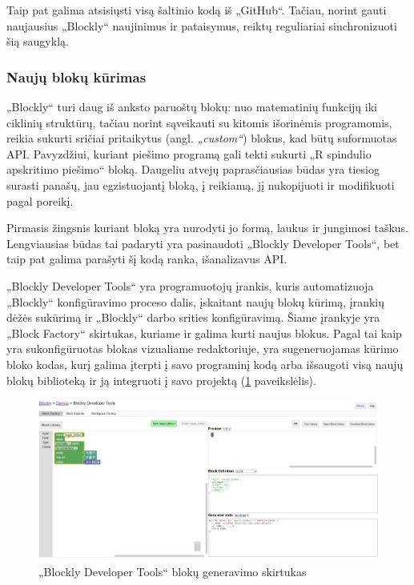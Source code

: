 \documentclass{VUMIFPSkursinis}
\begin{document}
Taip pat galima atsisiųsti visą šaltinio kodą iš „GitHub“. Tačiau, norint gauti naujausius „Blockly“ naujinimus ir pataisymus, reiktų reguliariai sinchronizuoti šią saugyklą.

\subsubsection{Naujų blokų kūrimas}

„Blockly“ turi daug iš anksto paruoštų blokų: nuo matematinių funkcijų iki ciklinių struktūrų, tačiau norint sąveikauti su kitomis išorinėmis programomis, reikia sukurti sričiai pritaikytus (angl. \textit{„custom“}) blokus, kad būtų suformuotas API. Pavyzdžiui, kuriant piešimo programą gali tekti sukurti „R spindulio apskritimo piešimo“ bloką. Daugeliu atvejų paprasčiausias būdas yra tiesiog surasti panašų, jau egzistuojantį bloką, į reikiamą, jį nukopijuoti ir modifikuoti pagal poreikį.


Pirmasis žingsnis kuriant bloką yra nurodyti jo formą, laukus ir jungimosi taškus. Lengviausias būdas tai padaryti yra pasinaudoti „Blockly Developer Tools“, bet taip pat galima parašyti šį kodą ranka, išanalizavus API.

„Blockly Developer Tools“ yra programuotojų įrankis, kuris automatizuoja „Blockly“ konfigūravimo proceso dalis, įskaitant naujų blokų kūrimą, įrankių dėžės sukūrimą ir „Blockly“ darbo srities konfigūravimą. Šiame įrankyje yra „Block Factory“ skirtukas, kuriame ir galima kurti naujus blokus. Pagal tai kaip yra sukonfigūruotas blokas vizualiame redaktoriuje, yra sugeneruojamas kūrimo bloko kodas, kurį galima įterpti į savo programinį kodą arba išsaugoti visą naujų blokų biblioteką ir ją integruoti į savo projektą (\ref{img:developerTools} paveikslėlis). \cite{blockly-developer-tools}

\begin{figure}[H]
    \centering
    \includegraphics[scale=0.3]{img/developerTools.png}
    \caption{„Blockly Developer Tools“ blokų generavimo skirtukas}
    \label{img:developerTools}
\end{figure}
\end{document}
